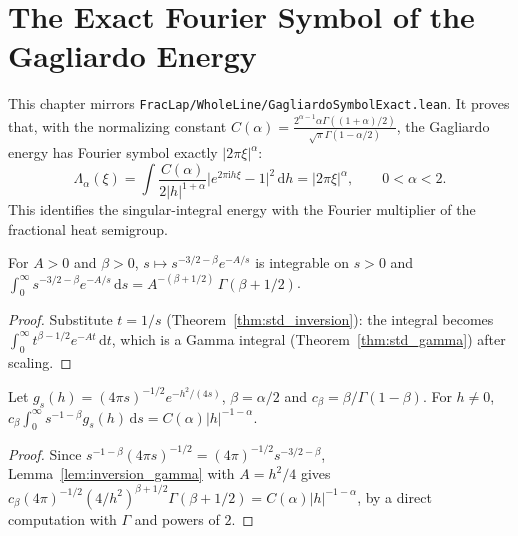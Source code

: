 \chapter{The Exact Fourier Symbol of the Gagliardo Energy}

This chapter mirrors \texttt{FracLap/WholeLine/GagliardoSymbolExact.lean}. It proves that, with the normalizing constant $C(\alpha) = \frac{2^{\alpha-1} \alpha \Gamma((1+\alpha)/2)}{\sqrt{\pi} \Gamma(1 - \alpha/2)}$, the Gagliardo energy has Fourier symbol exactly $\lvert 2\pi\xi \rvert^\alpha$:
\[
  \Lambda_\alpha(\xi) = \int \frac{C(\alpha)}{2 \lvert h \rvert^{1+\alpha}} \lvert e^{2\pi \mathrm{i} h \xi} - 1 \rvert^2\, \mathrm{d}h = \lvert 2\pi \xi \rvert^\alpha, \qquad 0 < \alpha < 2.
\]
This identifies the singular-integral energy with the Fourier multiplier of the fractional heat semigroup.

\begin{lemma}\label{lem:inversion_gamma}
\leanok
For $A > 0$ and $\beta > 0$, $s \mapsto s^{-3/2-\beta} e^{-A/s}$ is integrable on $s > 0$ and $\int_0^\infty s^{-3/2-\beta} e^{-A/s}\, \mathrm{d}s = A^{-(\beta + 1/2)}\, \Gamma(\beta + 1/2)$.
\end{lemma}

\begin{proof}
\leanok
Substitute $t = 1/s$ (Theorem~\ref{thm:std_inversion}): the integral becomes $\int_0^\infty t^{\beta - 1/2} e^{-A t}\, \mathrm{d}t$, which is a Gamma integral (Theorem~\ref{thm:std_gamma}) after scaling.
\end{proof}

\begin{lemma}\label{lem:subordinated_kernel}
\leanok
Let $g_s(h) = (4\pi s)^{-1/2} e^{-h^2/(4s)}$, $\beta = \alpha/2$ and $c_\beta = \beta/\Gamma(1 - \beta)$. For $h \ne 0$, $c_\beta \int_0^\infty s^{-1-\beta} g_s(h)\, \mathrm{d}s = C(\alpha) \lvert h \rvert^{-1-\alpha}$.
\end{lemma}

\begin{proof}
\leanok
Since $s^{-1-\beta} (4\pi s)^{-1/2} = (4\pi)^{-1/2} s^{-3/2-\beta}$, Lemma~\ref{lem:inversion_gamma} with $A = h^2/4$ gives $c_\beta (4\pi)^{-1/2} (4/h^2)^{\beta + 1/2} \Gamma(\beta + 1/2) = C(\alpha) \lvert h \rvert^{-1-\alpha}$, by a direct computation with $\Gamma$ and powers of $2$.
\end{proof}

